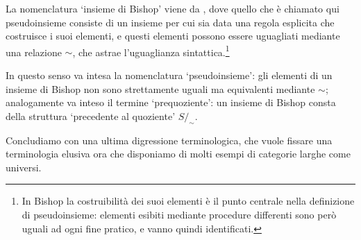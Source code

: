 \begin{terminology}
	La nomenclatura `insieme di Bishop' viene da \cite{Bishop1985}, dove quello che è chiamato qui pseudoinsieme consiste di un insieme per cui sia data una regola esplicita che costruisce i suoi elementi, e questi elementi possono essere uguagliati mediante una relazione \(\sim\), che astrae l'uguaglianza sintattica.\footnote{In Bishop la costruibilità dei suoi elementi è il punto centrale nella definizione di pseudoinsieme: elementi esibiti mediante procedure differenti sono però uguali ad ogni fine pratico, e vanno quindi identificati.}

	In questo senso va intesa la nomenclatura `pseudoinsieme': gli elementi di un insieme di Bishop non sono strettamente uguali ma equivalenti mediante \(\sim\); analogamente va inteso il termine `prequoziente': un insieme di Bishop consta della struttura `precedente al quoziente' \(S/_\sim\).
\end{terminology}
Concludiamo con una ultima digressione terminologica, che vuole fissare una terminologia elusiva ora che disponiamo di molti esempi di categorie larghe come universi.
